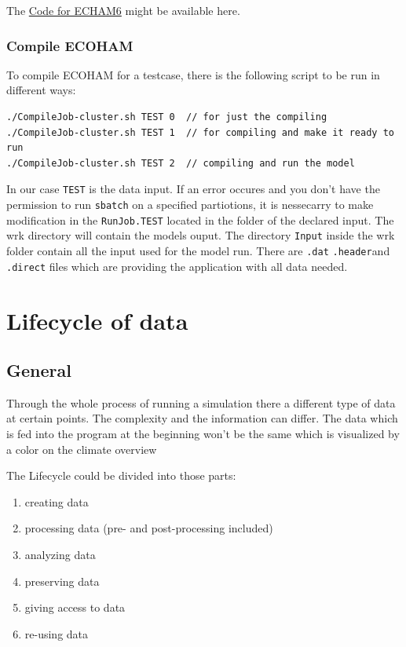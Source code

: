 \documentclass[]{article}
\providecommand{\tightlist}{%
  \setlength{\itemsep}{0pt}\setlength{\parskip}{0pt}}
\begin{document}
The \href{http://www.mpimet.mpg.de/en/science/models/license/}{Code for
ECHAM6} might be available here.

\subsubsection{Compile ECOHAM}\label{compile-ecoham}

To compile ECOHAM for a testcase, there is the following script to be
run in different ways:

\begin{verbatim}
./CompileJob-cluster.sh TEST 0  // for just the compiling
./CompileJob-cluster.sh TEST 1  // for compiling and make it ready to run
./CompileJob-cluster.sh TEST 2  // compiling and run the model
\end{verbatim}

In our case \texttt{TEST} is the data input. If an error occures and you
don't have the permission to run \texttt{sbatch} on a specified
partiotions, it is nessecarry to make modification in the
\texttt{RunJob.TEST} located in the folder of the declared input. The
wrk directory will contain the models ouput. The directory
\texttt{Input} inside the wrk folder contain all the input used for the
model run. There are \texttt{.dat} \texttt{.header}and \texttt{.direct}
files which are providing the application with all data needed.

\section{Lifecycle of data}\label{lifecycle-of-data}

\subsection{General}\label{general}

Through the whole process of running a simulation there a different type
of data at certain points. The complexity and the information can
differ. The data which is fed into the program at the beginning won't be
the same which is visualized by a color on the climate overview

The Lifecycle could be divided into those parts:

\begin{enumerate}
\def\labelenumi{\arabic{enumi}.}
\tightlist
\item
  creating data
\item
  processing data (pre- and post-processing included)
\item
  analyzing data
\item
  preserving data
\item
  giving access to data
\item
  re-using data
\end{enumerate}
\end{document}

